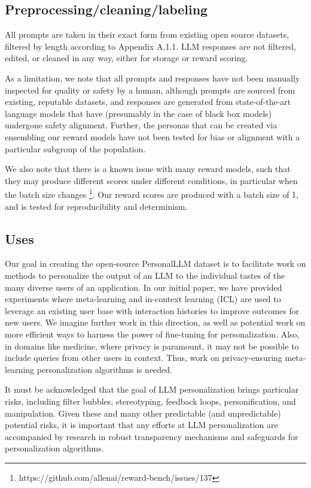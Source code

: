 \subsection{Preprocessing/cleaning/labeling}

All prompts are taken in their exact form from existing open source datasets, filtered by length according to Appendix A.1.1.  LLM responses are not filtered, edited, or cleaned in any way, either for storage or reward scoring.  

As a limitation, we note that all prompts and responses have not been manually inspected for quality or safety by a human, although prompts are sourced from existing, reputable datasets, and responses are generated from state-of-the-art language models that have (presumably in the case of black box models) undergone safety alignment.  Further, the personas that can be created via ensembling our reward models have not been tested for bias or alignment with a particular subgroup of the population.

We also note that there is a known issue with many reward models, such that they may produce different scores under different conditions, in particular when the batch size changes \footnote{https://github.com/allenai/reward-bench/issues/137}.  Our reward scores are produced with a batch size of 1, and is tested for reproducibility and determinism.

\subsection{Uses}

Our goal in creating the open-source PersonalLLM dataset is to facilitate work on methods to personalize the output of an LLM to the individual tastes of the many diverse users of an application.
In our initial paper, we have provided experiments where meta-learning and in-context learning (ICL) are used to leverage an existing user base with interaction histories to improve outcomes for new users.
We imagine further work in this direction, as well as potential work on more efficient ways to harness the power of fine-tuning for personalization. Also, in domains like medicine, where privacy is paramount, it may not be possible to include queries from other users in context.  Thus, work on privacy-ensuring meta-learning personalization algorithms is needed. 

It must be acknowledged that the goal of LLM personalization brings particular risks, including filter bubbles, stereotyping, feedback loops, personification, and manipulation.
Given these and many other predictable (and unpredictable) potential risks, it is important that any efforts at LLM personalization are accompanied by research in robust transparency mechanisms and safeguards for personalization algorithms.

